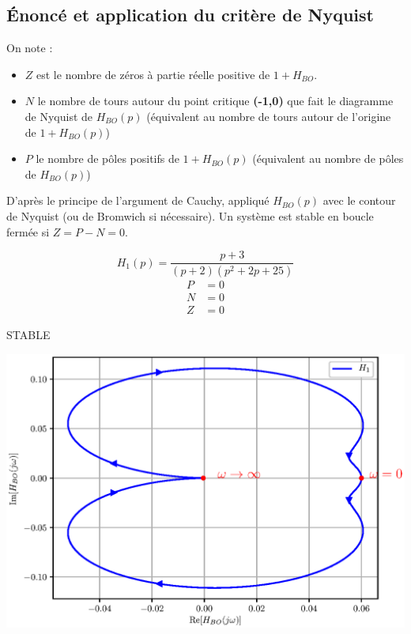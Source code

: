 \subsection{\'Enoncé et application du critère de Nyquist}
On note :
\begin{itemize}
    \item $Z$ est le nombre de zéros à partie réelle positive de $1+H_{BO}$.  
    \item $N$ le nombre de tours autour du point critique \textbf{(-1,0)} que 
          fait le diagramme de Nyquist de $H_{BO}(p)$ 
          (équivalent au nombre de tours autour de l'origine de $1+H_{BO}(p)$)
    \item $P$ le nombre de pôles positifs de $1+H_{BO}(p)$ (équivalent au 
          nombre de pôles de $H_{BO}(p)$)
\end{itemize}
D'après le principe de l'argument de Cauchy, appliqué $H_{BO}(p)$ avec le 
contour de Nyquist (ou de Bromwich si nécessaire). Un système est stable en 
boucle fermée si $Z=P-N=0$.

\begin{minipage}{0.35\textwidth}
\[
        H_1(p)=\dfrac{p+3}{(p+2)(p^2+2p+25)}
\]
    \begin{align*}
        P&=0\\
        N&=0\\
        Z&=0
    \end{align*}

{
       \hfill\LARGE\textcolor{col3}{STABLE}\hfill
}
\end{minipage}
\begin{minipage}{0.65\textwidth}
\begin{center}
\includegraphics[width=\textwidth]{fig/chap_stab_h1.eps}
\end{center}
\end{minipage}

